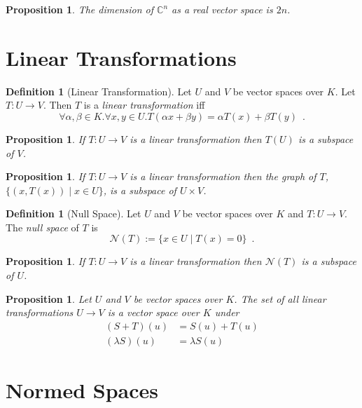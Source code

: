 \documentclass{book}
\newtheorem{prop}[ax]{Proposition}
\theoremstyle{definition}
\newtheorem{df}[ax]{Definition}
\begin{document}
\begin{prop}
The dimension of $\mathbb{C}^n$ as a real vector space is $2n$.
\end{prop}

\section{Linear Transformations}

\begin{df}[Linear Transformation]
Let $U$ and $V$ be vector spaces over $K$. Let $T : U \rightarrow V$. Then $T$ is a \emph{linear transformation} iff
\[ \forall \alpha, \beta \in K. \forall x,y \in U. T(\alpha x + \beta y) = \alpha T(x) + \beta T(y) \enspace . \]
\end{df}

\begin{prop}
If $T : U \rightarrow V$ is a linear transformation then $T(U)$ is a subspace of $V$.
\end{prop}

\begin{prop}
If $T : U \rightarrow V$ is a linear transformation then the graph of $T$, $\{ (x, T(x)) \mid x \in U \}$, is a subspace of $U \times V$.
\end{prop}

\begin{df}[Null Space]
Let $U$ and $V$ be vector spaces over $K$ and $T : U \rightarrow V$. The \emph{null space} of $T$ is
\[ \mathcal{N}(T) := \{ x \in U \mid T(x) = 0 \} \enspace . \]
\end{df}

\begin{prop}
If $T : U \rightarrow V$ is a linear transformation then $\mathcal{N}(T)$ is a subspace of $U$.
\end{prop}

\begin{prop}
Let $U$ and $V$ be vector spaces over $K$. The set of all linear transformations $U \rightarrow V$ is a vector space over $K$ under
\begin{align*}
(S + T)(u) & = S(u) + T(u) \\
(\lambda S)(u) & = \lambda S(u)
\end{align*}
\end{prop}

\section{Normed Spaces}
\end{document}
